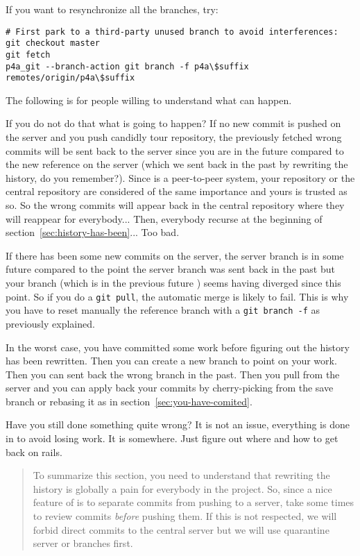 \documentclass[a4paper]{article}
\begin{document}
If you want to resynchronize all the branches, try:
\begin{verbatim}
# First park to a third-party unused branch to avoid interferences:
git checkout master
git fetch
p4a_git --branch-action git branch -f p4a\$suffix remotes/origin/p4a\$suffix
\end{verbatim}

The following is for people willing to understand what can happen.

If you do not do that what is going to happen? If no new commit is pushed
on the server and you push candidly tour repository, the previously
fetched wrong commits will be sent back to the server since you are in the
future compared to the new reference on the server (which we sent back in
the past by rewriting the history, do you remember?). Since \Agit is a
peer-to-peer system, your repository or the central repository are
considered of the same importance and yours is trusted as so. So the wrong
commits will appear back in the central repository where they will
reappear for everybody... \frownie{} Then, everybody recurse at the
beginning of section~\ref{sec:history-has-been}... Too bad.

If there has been some new commits on the server, the server branch is in
some future compared to the point the server branch was sent back in the
past but your branch (which is in the previous future \smiley) seems
having diverged since this point. So if you do a \texttt{git pull}, the
automatic merge is likely to fail. This is why you have to reset manually
the reference branch with a \texttt{git branch -f} as previously
explained.

In the worst case, you have committed some work before figuring out the
history has been rewritten. Then you can create a new branch to point on
your work. Then you can sent back the wrong branch in the past. Then you
pull from the server and you can apply back your commits by cherry-picking
from the save branch or rebasing it as in
section~\ref{sec:you-have-comited}.

Have you still done something quite wrong? It is not an issue, everything
is done in \Agit to avoid losing work. It is somewhere. Just figure out
where and how to get back on rails. \smiley

\begin{quote}
  To summarize this section, you need to understand that rewriting the
  history is globally a pain for everybody in the project. So, since a
  nice feature of \Agit is to separate commits from pushing to a server,
  take some times to review commits \emph{before} pushing them. If this is
  not respected, we will forbid direct commits to the central server but
  we will use quarantine server or branches first.
\end{quote}
\end{document}
